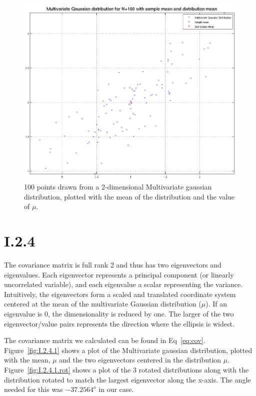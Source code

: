 \begin{figure}[h!]
	\includegraphics[width=\textwidth]{img/multigaussmeanxy}
	\caption{100 points drawn from a 2-dimensional Multivariate gaussian
          distribution, plotted with the mean of the distribution and the value
          of $\mu$. \label{fig:I.2.3}}
\end{figure}

\FloatBarrier
\section*{I.2.4}
The covariance matrix is full rank 2 and thus has two eigenvectors and
eigenvalues. Each eigenvector represents a principal component (or linearly
uncorrelated variable), and each eigenvalue a scalar representing the variance.
Intuitively, the eigenvectors form a scaled and translated coordinate system
centered at the mean of the multivariate Gaussian distribution ($\mu$). If an
eigenvalue is 0, the dimensionality is reduced by one. The larger of the two
eigenvector/value pairs represents the direction where the ellipsis is widest.

The covariance matrix we calculated can be found in
Eq~\ref{eq:cov}. Figure~\ref{fig:I.2.4.1} shows a plot of the Multivariate
gaussian distribution, plotted with the mean, $\mu$ and the two eigenvectors
centered in the distribution $\mu$. Figure~\ref{fig:I.2.4.1.rot} shows a plot of
the 3 rotated distributions along with the distribution rotated to match the
largest eigenvector along the x-axis. The angle needed for this was $-37.2564^o$
in our case.

